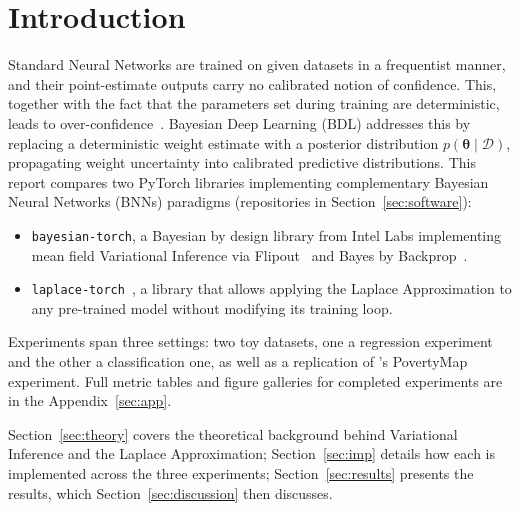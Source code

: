 \documentclass[conference]{IEEEtran}
\newcommand{\btheta}{\bm{\theta}}
\newcommand{\cD}{\mathcal{D}}
\begin{document}




%
\IEEEpeerreviewmaketitle


\section{Introduction}
\label{sec:intro}

Standard Neural Networks are trained on given datasets in a frequentist manner, and their
point-estimate outputs carry no calibrated notion of confidence. This, together with the
fact that the parameters set during training are deterministic, leads to
over-confidence~\citep{goan2020bayesian,murphy2023pml}. Bayesian Deep Learning (BDL)
addresses this by replacing a deterministic
weight estimate with a posterior distribution $p(\btheta \mid \cD)$, propagating weight
uncertainty into calibrated predictive distributions. This report compares two PyTorch
libraries implementing complementary Bayesian Neural Networks (BNNs) paradigms
(repositories in Section~\ref{sec:software}):
\begin{itemize}[leftmargin=*]
	\item \texttt{bayesian-torch}, a
	      Bayesian by design library from Intel Labs implementing mean field
	      Variational Inference via Flipout~\citep{wen2018flipout} and
	      Bayes by Backprop~\citep{blundell2015weight}.
	\item \texttt{laplace-torch}~\citep{daxberger2021laplace},
	      a library that allows applying the Laplace Approximation to any
	      pre-trained model without modifying its training loop.
\end{itemize}

Experiments span three settings: two toy datasets, one a regression experiment and the other
a classification one, as well as a replication of \citet{daxberger2021laplace}'s PovertyMap
experiment. Full metric tables and figure galleries for completed experiments are in the
Appendix~\ref{sec:app}.

Section~\ref{sec:theory} covers the theoretical background behind Variational Inference and
the Laplace Approximation; Section~\ref{sec:imp} details how each is implemented across the
three experiments; Section~\ref{sec:results} presents the results, which
Section~\ref{sec:discussion} then discusses.
\end{document}
